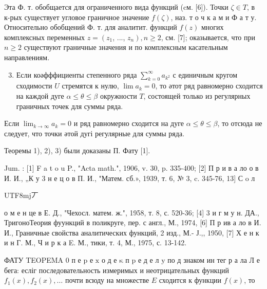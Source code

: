 \documentclass[10pt]{article}
\begin{document}
Эта Ф. т. обобщается для ограниченного вида функций (cм. [6]). Точки $\zeta \in T$, в к-рых существует угловое граничное значение $f(\zeta)$, наз. т о ч к а м и Ф а т у. Относительно обобщений Ф. т. для аналитит. функций $f(z)$ многих комплексных переменных $z=\left(z_{1}\right.$, ..., $\left.z_{n}\right), n \geqslant 2$, см. [7]; оказывается, что при $n \geqslant 2$ существуют граничные значения и по комплексным касательным направлениям.



\begin{enumerate}

  \setcounter{enumi}{2}

  \item Если коәфффициенты степенного ряда $\sum_{k=0}^{\infty} a_{k^{2}}$ с единичным кругом сходимости $U$ стремятся к нулю, $\lim a_{k}=0$, то әтот ряд равномерно сходится на каждой дуге $\alpha \leqslant \theta \leqslant \beta$ окружности $T$, состоящей только из регулярных граничных точек для суммы ряда.

\end{enumerate}



Если $\lim _{k \rightarrow \infty} a_{k}=0$ и ряд равномерно сходится на дуге $\alpha \leqslant \theta \leqslant \beta$, то отсюда не следует, что точки әтой дугі регулярные для суммы ряда.



Теоремы 1), 2), 3) были доказаны П. Фату [1].



Jum. : [1] F a t o u P., "Acta math.", 1906, v. 30, p. 335-400; [2] П р и в а ло о в И. И., „К у 3 н е ц о в П. И., "Матем. сб.», 1939, т. 6, № 3, c. 345-76, 13] С o л\begin{CJK}{UTF8}{mj}丆\end{CJK} о м е н це в Е. Д., "Чехосл. матем. ж.", 1958, т. 8, с. 520-36; [4] 3 и г м у н. ДА., ТригоноТеория фуункций в поликруге, пер. с англ., М., 1974, [6] П р ив а ло в И. И., Граничные свойства аналитических функций, 2 изд., М.- Ј.,, 1950, [7] Х е н к и н Г. М., Ч и р к а E. М., тики, т. 4, М., 1975, с. 13-142.



ФАТУ TEOPEMA 0 п е $\mathrm{p}$ е $\mathrm{x}$ о д е $\mathrm{\kappa}$ п $\mathrm{p}$ е д е л $\mathrm{y}$ по д знаком ин тег р а ла Л е бега: есліг последовательность измеримых и неотрицательных функций $f_{1}(x), f_{2}(x), \ldots$ почти всюду на множестве $E$ сходится к функции $f(x)$, то
\end{document}
